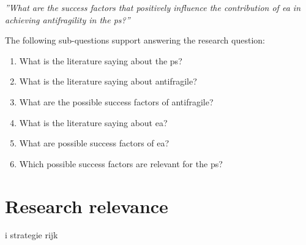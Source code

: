 \noindent \emph{''What are the success factors that positively influence the contribution of \acrlong{ea} in achieving \gls{antifragility} in the \gls{ps}?''}\bigskip

\noindent The following sub-questions support answering the research question:

\begin{enumerate}
	\item{What is the literature saying about the \gls{ps}?}
	\item{What is the literature saying about \gls{antifragile}?}
	\item{What are the possible success factors of \gls{antifragile}?}
	\item{What is the literature saying about \acrlong{ea}?}
	\item{What are possible success factors of \acrlong{ea}?}
	\item{Which possible success factors are relevant for the \gls{ps}?}
\end{enumerate}

\section{Research relevance}
\label{sec:researchrelevance}

i strategie rijk


